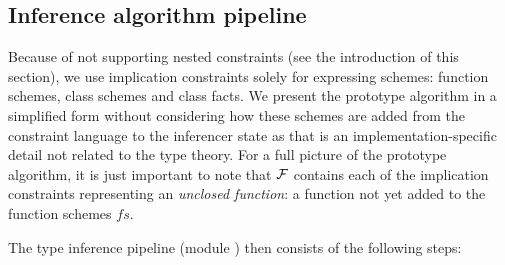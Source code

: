 \subsection{Inference algorithm pipeline}
\label{sec:inferPipeline}

Because of not supporting nested constraints (see the introduction of this section), we use implication constraints solely for expressing schemes: function schemes, class schemes and class facts. We present the prototype algorithm in a simplified form without considering how these schemes are added from the constraint language to the inferencer state as that is an implementation-specific detail not related to the type theory. For a full picture of the prototype algorithm, it is just important to note that $\mathcal F$ contains each of the implication constraints representing an \emph{unclosed function}: a function not yet added to the function schemes $fs$.

The type inference pipeline (module ) then consists of the following steps:

